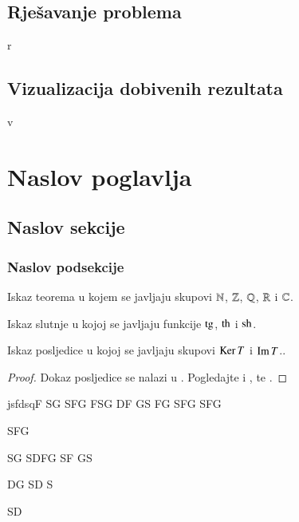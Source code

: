 \documentclass[a4paper,twoside,12pt]{memoir} %
\begin{document}
\section{Rješavanje problema}
r

\section{Vizualizacija dobivenih rezultata}
v









\chapter[Naslov poglavlja u sadržaju][Kratki naslov poglavlja]{Naslov poglavlja}	

\section[Naslov sekcije u sadržaju][Kratki naslov sekcije]{Naslov sekcije}
\subsection{Naslov podsekcije}
\begin{thm}
Iskaz teorema u kojem se javljaju skupovi  $\mathbb{N}$, $\mathbb{Z}$, $\mathbb{Q}$, $\mathbb{R}$ i $\mathbb{C}$.
\end{thm}
\begin{conj}
Iskaz slutnje u kojoj se javljaju funkcije $\operatorname{tg}$, $\operatorname{th}$ i $\operatorname{sh}$.
\end{conj}
\begin{cor}
Iskaz posljedice u kojoj se javljaju skupovi $\operatorname{Ker} T$ i $\operatorname{Im} T$..
\end{cor}
\begin{proof}
Dokaz posljedice se nalazi u \cite{kljuc}. Pogledajte i \cite{kurepa1956convex}, \cite{kurepa1981funkcionalna} te \cite{Dutkay:2009}.
\end{proof}
jsfdsqF
SG
SFG
FSG
DF
GS
FG
SFG
SFG

SFG

SG
SDFG
SF
GS

DG
 SD
S


SD
 
\end{document}
